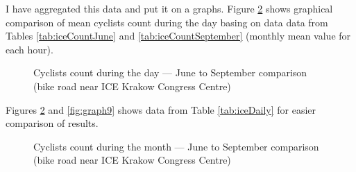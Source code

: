 I have aggregated this data and put it on a graphs. Figure \ref{fig:graph2} shows graphical comparison of mean cyclists count during the day basing on data data from Tables \ref{tab:iceCountJune} and \ref{tab:iceCountSeptember} (monthly mean value for each hour).
\begin{figure}[H]
    \centering
    \caption{Cyclists count during the day --- June to September comparison (bike road near ICE Krakow Congress Centre)}
    \label{fig:graph4}
\end{figure}
Figures \ref{fig:graph2} and \ref{fig:graph9} shows data from Table \ref{tab:iceDaily} for easier comparison of results.
\begin{figure}[H]
    \centering
    \caption{Cyclists count during the month --- June to September comparison (bike road near ICE Krakow Congress Centre)}
    \label{fig:graph2}
\end{figure}

